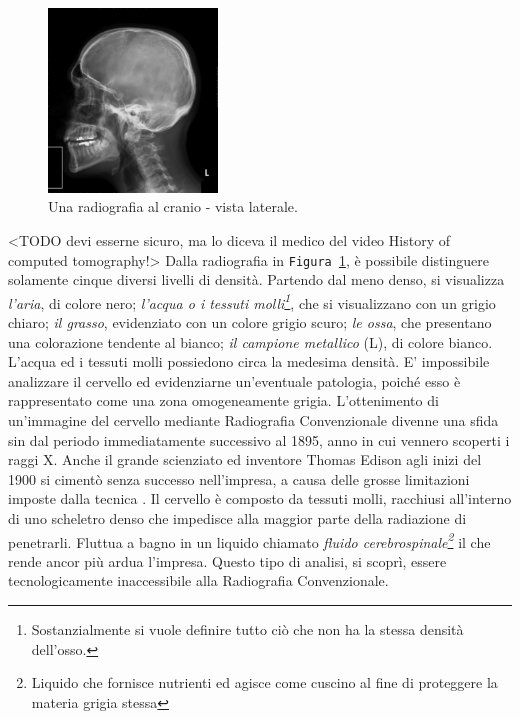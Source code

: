 \documentclass[a4paper,12pt, doubleside]{report}
\begin{document}
                    \begin{figure}[h]
                        \centering
                        \includegraphics[width=0.4\textwidth]{radiografia}
                        \caption{Una radiografia al cranio - vista laterale.}
                        \label{fig:skull}
                    \end{figure}
                        
                    \bigskip
                    <TODO devi esserne sicuro, ma lo diceva il medico del video History of computed tomography!>
                    Dalla radiografia in \texttt{Figura \ref{fig:skull}}, è possibile distinguere solamente cinque diversi livelli di densità. Partendo dal meno denso, si visualizza \textit{l'aria}, di colore nero; \textit{l'acqua o i tessuti molli\footnote{Sostanzialmente si vuole definire tutto ciò che non ha la stessa densità dell'osso.}}, che si visualizzano con un grigio chiaro; \textit{il grasso}, evidenziato con un colore grigio scuro; \textit{le ossa}, che presentano una colorazione tendente al bianco; \textit{il campione metallico} (L), di colore bianco. L’acqua ed i tessuti molli possiedono circa la medesima densità. E' impossibile analizzare il cervello ed evidenziarne un'eventuale patologia, poiché esso è rappresentato come una zona omogeneamente grigia. L'ottenimento di un'immagine del cervello mediante Radiografia Convenzionale divenne una sfida sin dal periodo immediatamente successivo al 1895, anno in cui vennero scoperti i raggi X. Anche il grande scienziato ed inventore Thomas Edison agli inizi del 1900 si cimentò senza successo nell'impresa, a causa delle grosse limitazioni imposte dalla tecnica \cite{thomas-edison-brain}. Il cervello è composto da tessuti molli, racchiusi all’interno di uno scheletro denso che impedisce alla maggior parte della radiazione di penetrarli. Fluttua a bagno in un liquido chiamato \textit{fluido cerebrospinale\footnote{Liquido che fornisce nutrienti ed agisce come cuscino al fine di proteggere la materia grigia stessa}} il che rende ancor più ardua l'impresa. Questo tipo di analisi, si scoprì, essere tecnologicamente inaccessibile alla Radiografia Convenzionale.
                
\end{document}
